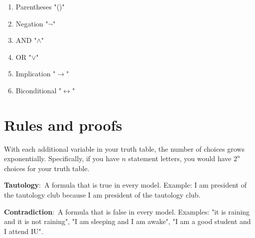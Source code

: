 \documentclass[nobib]{tufte-handout}
\newcommand{\defn}[2]{\noindent\textbf{#1}:\ #2}
\let\biconditional\leftrightarrow
\begin{document}
\begin{enumerate}
    \item Parentheses "()"
    \item Negation "$\neg$"
    \item AND "$\land$"
    \item OR "$\lor$"
    \item Implication "$\rightarrow$"
    \item Biconditional "$\biconditional$"
\end{enumerate}

\pagebreak 

\section{Rules and proofs}

With each additional variable in your truth table, the number
of choices grows exponentially. Specifically, if you have $n$ statement
letters, you would have $2^n$ choices for your truth table. 

\defn{Tautology}{A formula that is true in every model.} 
Example: I am president of the tautology club because 
I am president of the tautology club. 

\defn{Contradiction}{A formula that is false in every model}. Examples:
"it is raining and it is not raining", "I am sleeping and I am awake", 
"I am a good student and I attend IU". 

\end{document}
